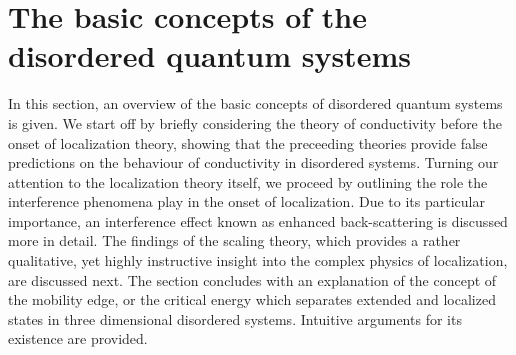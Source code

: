 \documentclass[10pt,a4paper]{article}
\begin{document}
\section{The basic concepts of the disordered quantum systems}
\label{sec:basic}
In this section, an overview of the basic concepts of disordered quantum systems is given. We start off by briefly considering the theory of conductivity before the onset of localization theory, showing that the preceeding theories provide false predictions on the behaviour of conductivity in disordered systems. Turning our attention to the localization theory itself, we proceed by outlining the role the interference phenomena play in the onset of localization. Due to its particular importance, an interference effect known as enhanced back-scattering is discussed more in detail. The findings of the scaling theory, which provides a rather qualitative, yet highly instructive insight into the complex physics of localization, are discussed next. The section concludes with an explanation of the concept of the mobility edge, or the critical energy which separates extended and localized states in three dimensional disordered systems. Intuitive arguments for its existence are provided. 
\end{document}
